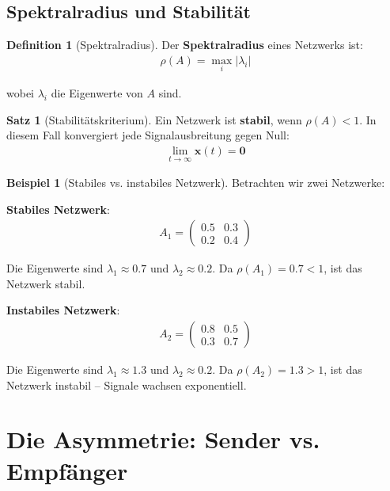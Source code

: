 ﻿\documentclass[a4paper,12pt]{report}
\theoremstyle{definition}
\newtheorem{definition}{Definition}
\newtheorem{beispiel}{Beispiel}
\newtheorem{satz}{Satz}
\begin{document}
	\subsection{Spektralradius und Stabilität}
	
	\begin{definition}[Spektralradius]
		Der \textbf{Spektralradius} eines Netzwerks ist:
		\begin{align}
			\rho(A) = \max_i |\lambda_i|
		\end{align}
		
		wobei $\lambda_i$ die Eigenwerte von $A$ sind.
	\end{definition}
	
	\begin{satz}[Stabilitätskriterium]
		Ein Netzwerk ist \textbf{stabil}, wenn $\rho(A) < 1$. In diesem Fall konvergiert jede Signalausbreitung gegen Null:
		\begin{align}
			\lim_{t \to \infty} \mathbf{x}(t) = \mathbf{0}
		\end{align}
	\end{satz}
	
	\begin{beispiel}[Stabiles vs. instabiles Netzwerk]
		Betrachten wir zwei Netzwerke:
		
		\textbf{Stabiles Netzwerk}:
		\begin{align}
			A_1 = \begin{pmatrix} 0.5 & 0.3 \\ 0.2 & 0.4 \end{pmatrix}
		\end{align}
		
		Die Eigenwerte sind $\lambda_1 \approx 0.7$ und $\lambda_2 \approx 0.2$. Da $\rho(A_1) = 0.7 < 1$, ist das Netzwerk stabil.
		
		\textbf{Instabiles Netzwerk}:
		\begin{align}
			A_2 = \begin{pmatrix} 0.8 & 0.5 \\ 0.3 & 0.7 \end{pmatrix}
		\end{align}
		
		Die Eigenwerte sind $\lambda_1 \approx 1.3$ und $\lambda_2 \approx 0.2$. Da $\rho(A_2) = 1.3 > 1$, ist das Netzwerk instabil -- Signale wachsen exponentiell.
	\end{beispiel}
	
	\section{Die Asymmetrie: Sender vs. Empfänger}
	
\end{document}
